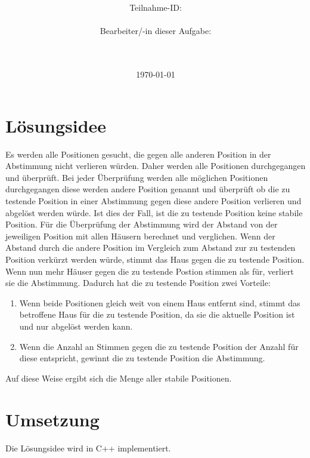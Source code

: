 \documentclass[a4paper,10pt,ngerman]{scrartcl}
\title{\textbf{\Huge\Aufgabe}}
\author{\LARGE Teilnahme-ID: \LARGE \TeilnahmeId \\\\
	    \LARGE Bearbeiter/-in dieser Aufgabe: \\ 
	    \LARGE \Name\\\\}
\date{\LARGE\today}
\begin{document}
\maketitle
\tableofcontents

\vspace{0.5cm}

\section{Lösungsidee}
Es werden alle Positionen gesucht, die gegen alle anderen Position in der Abstimmung nicht verlieren würden.
Daher werden alle Positionen durchgegangen und überprüft.
Bei jeder Überprüfung werden alle möglichen Positionen durchgegangen diese werden andere Position genannt und überprüft ob die zu testende Position in einer Abstimmung gegen diese andere Position verlieren und abgelöst werden würde.
Ist dies der Fall, ist die zu testende Position keine stabile Position.
Für die Überprüfung der Abstimmung wird der Abstand von der jeweiligen Position mit allen Häusern berechnet und verglichen.
Wenn der Abstand durch die andere Position im Vergleich zum Abstand zur zu testenden Position verkürzt werden würde, stimmt das Haus gegen die zu testende Position.
Wenn nun mehr Häuser gegen die zu testende Postion stimmen als für, verliert sie die Abstimmung.
Dadurch hat die zu testende Position zwei Vorteile:
\begin{enumerate}
    \item Wenn beide Positionen gleich weit von einem Haus entfernt sind, stimmt das betroffene Haus für die zu testende Position, da sie die aktuelle Position ist und nur abgelöst werden kann.
    \item Wenn die Anzahl an Stimmen gegen die zu testende Position der Anzahl für diese entspricht, gewinnt die zu testende Position die Abstimmung.
\end{enumerate}

Auf diese Weise ergibt sich die Menge aller stabile Positionen.

\section{Umsetzung}
Die Lösungsidee wird in C++ implementiert.
\end{document}
